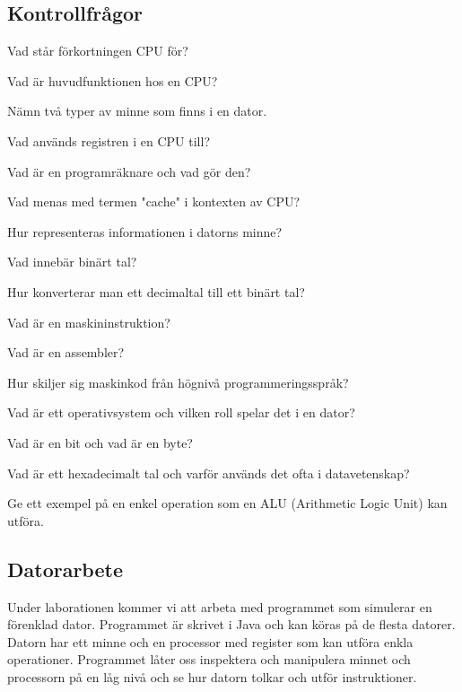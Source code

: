 \subsection*{Kontrollfrågor}
\begin{Kontrollfragor}
    \item Vad står förkortningen CPU för?
    \item Vad är huvudfunktionen hos en CPU?
    \item Nämn två typer av minne som finns i en dator.
    \item Vad används registren i en CPU till?
    \item Vad är en programräknare och vad gör den?
    \item Vad menas med termen "cache" i kontexten av CPU?
    \item Hur representeras informationen i datorns minne?
    \item Vad innebär binärt tal?
    \item Hur konverterar man ett decimaltal till ett binärt tal?
    \item Vad är en maskininstruktion?
    \item Vad är en assembler?
    \item Hur skiljer sig maskinkod från högnivå programmeringsspråk?
    \item Vad är ett operativsystem och vilken roll spelar det i en dator?
    \item Vad är en bit och vad är en byte?
    \item Vad är ett hexadecimalt tal och varför används det ofta i datavetenskap?
    \item Ge ett exempel på en enkel operation som en ALU (Arithmetic Logic Unit) kan utföra.
\end{Kontrollfragor}

% 

\clearpage
\subsection*{Datorarbete}
Under laborationen kommer vi att arbeta med programmet \progname{} som simulerar en förenklad dator. Programmet är skrivet i Java och kan köras på de flesta datorer. Datorn har ett minne och en processor med register som kan utföra enkla operationer. Programmet låter oss inspektera och manipulera minnet och processorn på en låg nivå och se hur datorn tolkar och utför instruktioner.


